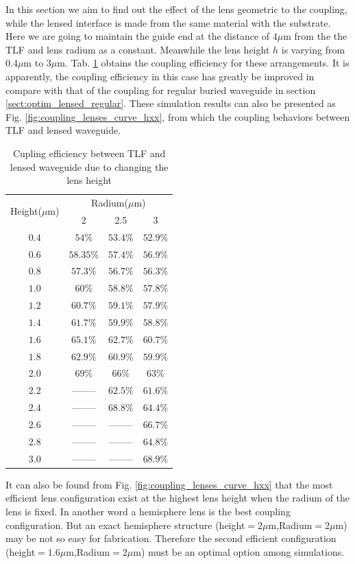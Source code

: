 In this section we aim to find out the effect of the lens geometric to the coupling, while the lensed interface is made from the same material with the substrate. Here we are going to maintain the guide end at the distance of $4\mu$m from the the TLF and lens radium as a constant. Meanwhile the lens height $h$  is varying from $0.4\mu$m to $3\mu$m. Tab. \ref{tab:coupling_lensed_waveguide_height} obtains the coupling efficiency for these arrangements. It is apparently, the coupling efficiency in this case has greatly be improved in compare with that of the coupling for regular buried waveguide in section \ref{sect:optim_lensed_regular}. These simulation results can also be presented as Fig. \ref{fig:coupling_lenses_curve_hxx}, from which the coupling behaviors between TLF and lensed waveguide.    
\begin{table}
\caption{Cupling efficiency between TLF and lensed waveguide due to changing the lens height}
\centering
\begin{tabular}{|c|c|c|c|}
\hline
\multirow{2}{*}{Height($\mu$m)}&\multicolumn{3}{c|}{Radium($\mu$m)}\\
\cline{2-4}
 			&	2&	2.5&	3\\
\hline
$0.4$&$54\%$&$53.4\%$&$52.9\%$\\
$0.6$&$58.35\%$&$57.4\%$&$56.9\%$\\
$0.8$&$57.3\%$&$56.7\%$&$56.3\%$\\
$1.0$&$60\%$&$58.8\%$&$57.8\%$\\
$1.2$&$60.7\%$&$59.1\%$&$57.9\%$\\
$1.4$&$61.7\%$&$59.9\%$&$58.8\%$\\
$1.6$&$65.1\%$&$62.7\%$&$60.7\%$\\
$1.8$&$62.9\%$&$60.9\%$&$59.9\%$\\
$2.0$&$69\%$  &  $66\%$&$63\%$\\
$2.2$&--------&$62.5\%$&$61.6\%$\\
$2.4$&--------&$68.8\%$&$64.4\%$\\
$2.6$&--------&--------&$66.7\%$\\
$2.8$&--------&--------&$64.8\%$\\
$3.0$&--------&--------&$68.9\%$\\
\hline
\end{tabular}
\label{tab:coupling_lensed_waveguide_height}
\end{table}
It can also be found from Fig. \ref{fig:coupling_lenses_curve_hxx} that the most efficient lens configuration exist at the highest lens height when the radium of the lens is fixed. In another word a hemisphere lens is the best coupling configuration. But an exact hemisphere structure (height$=2\mu$m,Radium$=2\mu$m) may be not so easy for fabrication. Therefore the second efficient configuration (height$=1.6\mu$m,Radium$=2\mu$m) must be  an optimal option among simulations.\\ 
